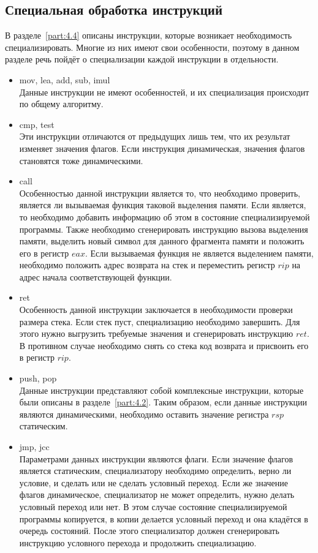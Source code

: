 \subsection{Специальная обработка инструкций}
\label{part:5.4}
В разделе~\ref{part:4.4} описаны инструкции, которые возникает необходимость специализировать. Многие из них имеют свои особенности, поэтому в данном разделе речь пойдёт о специализации каждой инструкции в отдельности.
\begin{itemize}
\item \textsf{mov, lea, add, sub, imul}\\
  Данные инструкции не имеют особенностей, и их специализация происходит по общему алгоритму.
\item \textsf{cmp, test}\\
  Эти инструкции отличаются от предыдущих лишь тем, что их результат изменяет значения флагов. Если инструкция динамическая, значения флагов становятся тоже динамическими.
\item \textsf{call}\\
  Особенностью данной инструкции является то, что необходимо проверить, является ли вызываемая функция
  таковой выделения памяти.
  Если является, то необходимо добавить информацию об этом в состояние
  специализируемой программы. Также необходимо сгенерировать инструкцию вызова выделения памяти,
  выделить новый символ для данного фрагмента памяти и положить его в регистр $eax$. Если вызываемая
  функция не является выделением памяти, необходимо положить адрес возврата на стек и переместить регистр
  $rip$ на адрес начала соответствующей функции.
\item \textsf{ret}\\
  Особенность данной инструкции заключается в необходимости проверки размера стека. Если стек пуст,
  специализацию необходимо завершить. Для этого нужно выгрузить требуемые значения и сгенерировать
  инструкцию $ret$. В противном случае необходимо снять со стека код возврата и присвоить его в регистр
  $rip$.
\item \textsf{push, pop}\\
  Данные инструкции представляют собой комплексные инструкции, которые были описаны
  в разделе~\ref{part:4.2}.
  Таким образом, если данные инструкции являются динамическими, необходимо оставить значение регистра
  $rsp$ статическим.
\item \textsf{jmp, jcc}\\
  Параметрами данных инструкции являются флаги. Если значение флагов является статическим, специализатору
  необходимо определить, верно ли условие, и сделать или не сделать условный переход.
  Если же значение флагов динамическое, специализатор не может определить, нужно делать условный переход
  или нет.
  В этом случае состояние специализируемой программы копируется, в копии делается условный переход
  и она кладётся в очередь состояний.
  После этого специализатор должен сгенерировать инструкцию условного перехода и продолжить специализацию.
\end{itemize}

